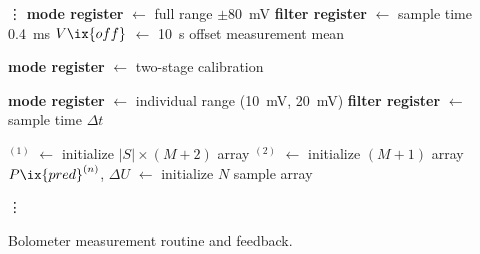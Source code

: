     \begin{algorithm}[H]%
        \vdots%
        \textbf{mode register} $\leftarrow$ full range $\pm$\SI{80}{\milli\volt}\;%
        \textbf{filter register} $\leftarrow$ sample time \SI{0.4}{\milli\second}\;
        $V\ix{off}$ $\leftarrow$ \SI{10}{\second} offset measurement mean\;
        \BlankLine%

        \textbf{mode register} $\leftarrow$ two-stage calibration\;%

        \textbf{mode register} $\leftarrow$ individual range (\SI{10}{\milli\volt}, \SI{20}{\milli\volt})\;%
        \textbf{filter register} $\leftarrow$ sample time $\Delta t$\;%
        \BlankLine%

        $^{\left(1\right)}$ $\leftarrow$ initialize $\vert S\vert\times\left(M+2\right)$ array\;%
        $^{\left(2\right)}$ $\leftarrow$ initialize $\left(M+1\right)$ array\;%
        $P\ix{pred}^{\left(n\right)}$, $\Delta U$ $\leftarrow$ initialize $N$ sample array\;%

        \vdots%
        \caption{Bolometer measurement routine and feedback.}%
    \end{algorithm}%
    \newpage%

